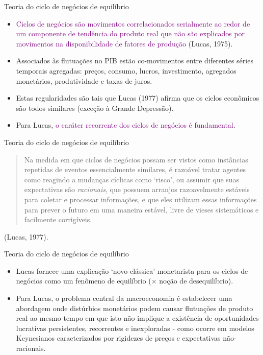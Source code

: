 \documentclass[10pt]{beamer}
\begin{document}
\begin{frame}{Teoria do ciclo de negócios de equilíbrio}
    \begin{itemize}
        \item \textcolor{purple}{Ciclos de negócios são movimentos correlacionados serialmente ao redor de um componente de tendência do produto real que não são explicados por movimentos na disponibilidade de fatores de produção} (Lucas, 1975).
        \bigskip
        \item Associados às flutuações no PIB estão co-movimentos entre diferentes séries temporais agregadas: preços, consumo, lucros, investimento, agregados monetários, produtividade e taxas de juros.
        \bigskip
        \item Estas regularidades são tais que Lucas (1977) afirma que os ciclos econômicos são todos similares (exceção à Grande Depressão).
        \bigskip
        \item Para Lucas, \textcolor{purple}{o caráter recorrente dos ciclos de negócios é fundamental}.
    \end{itemize}
\end{frame}

\begin{frame}{Teoria do ciclo de negócios de equilíbrio}
    \begin{quote}
        Na medida em que ciclos de negócios possam ser vistos como instâncias repetidas de eventos essencialmente similares, é razoável tratar agentes como reagindo a mudanças cíclicas como `risco', ou assumir que suas expectativas são \emph{racionais}, que possuem arranjos razoavelmente estáveis para coletar e processar informações, e que eles utilizam essas informações para prever o futuro em uma maneira estável, livre de vieses sistemáticos e facilmente corrigíveis.
    \end{quote}
    \begin{flushright}
    (Lucas, 1977).
    \end{flushright}
\end{frame}

\begin{frame}{Teoria do ciclo de negócios de equilíbrio}
    \begin{itemize}
        \item Lucas fornece uma explicação `novo-clássica' monetarista para os ciclos de negócios como um fenômeno de equilíbrio ($\times$ noção de desequilíbrio).
        \bigskip
        \item Para Lucas, o problema central da macroeconomia é estabelecer uma abordagem onde distúrbios monetários podem causar flutuações de produto real ao mesmo tempo em que isto não implique a existência de oportunidades lucrativas persistentes, recorrentes e inexploradas - como ocorre em modelos Keynesianos caracterizados por rigidezes de preços e expectativas não-racionais.
    \end{itemize}
\end{frame}
\end{document}
